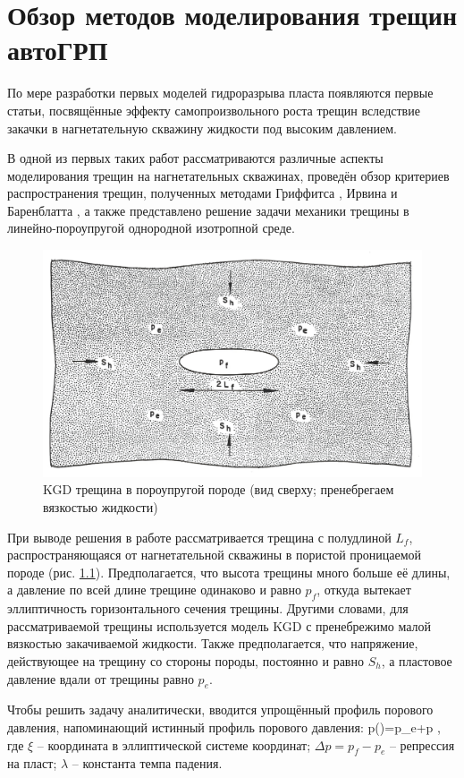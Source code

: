 \chapter{Обзор методов моделирования трещин автоГРП} \label{ch1}

По мере разработки первых моделей гидроразрыва пласта появляются первые статьи, посвящённые эффекту самопроизвольного роста трещин вследствие закачки в нагнетательную скважину жидкости под высоким давлением.

В одной из первых таких работ \cite{hagoort_phd} рассматриваются различные аспекты моделирования трещин на нагнетательных скважинах, проведён обзор критериев распространения трещин, полученных методами Гриффитса \cite{griffith}, Ирвина \cite{irwin} и Баренблатта \cite{barenblatt}, а также представлено решение задачи механики трещины в линейно-пороупругой однородной изотропной среде.

\begin{figure}[H] 
\center
\includegraphics[width=.55\linewidth]{images/Hagoort_model_scheme.jpg}
\caption{KGD трещина в пороупругой породе \cite{hagoort_phd} (вид сверху; пренебрегаем вязкостью жидкости)} 
\label{fig:hagoort_model_scheme}  
\end{figure}

При выводе решения в работе \cite{hagoort_phd} рассматривается трещина с полудлиной $L_{\!f}$, распространяющаяся от нагнетательной скважины в пористой проницаемой породе (рис. \ref{fig:hagoort_model_scheme}).
Предполагается, что высота трещины много больше её длины, а давление по всей длине трещине одинаково и равно $p_{\!f}$, откуда вытекает эллиптичность горизонтального сечения трещины.
Другими словами, для рассматриваемой трещины используется модель KGD с пренебрежимо малой вязкостью закачиваемой жидкости.
Также предполагается, что напряжение, действующее на трещину со стороны породы, постоянно и равно $S_h$, а пластовое давление вдали от трещины равно $p_e$.

Чтобы решить задачу аналитически, вводится упрощённый профиль порового давления, напоминающий истинный профиль порового давления:
\beq
p(\xi)=p_e+\Delta p ,
\eeq
где $\xi$ -- координата в эллиптической системе координат;
$\Delta p=p_f-p_e$ -- репрессия на пласт;
$\lambda$ -- константа темпа падения.

